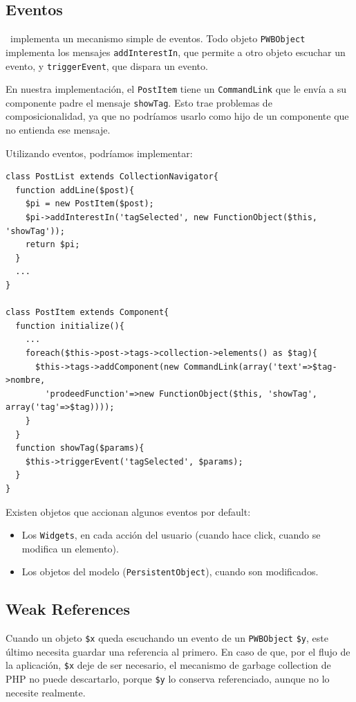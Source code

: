 
\subsection{Eventos}
\label{sub-events}
\PWB \ implementa un mecanismo simple de eventos. Todo objeto \verb"PWBObject" implementa los mensajes \verb"addInterestIn", que permite a otro objeto escuchar un evento, y \verb"triggerEvent", que dispara un evento.

En nuestra implementación, el \verb"PostItem" tiene un \verb"CommandLink" que le envía a su componente padre el mensaje \verb"showTag". Esto trae problemas de composicionalidad, ya que no podríamos usarlo como hijo de un componente que no entienda ese mensaje.



Utilizando eventos, podríamos implementar:

\begin{verbatim}
class PostList extends CollectionNavigator{
  function addLine($post){
    $pi = new PostItem($post);
    $pi->addInterestIn('tagSelected', new FunctionObject($this, 'showTag'));
    return $pi;
  }
  ...
}

class PostItem extends Component{
  function initialize(){
    ...
    foreach($this->post->tags->collection->elements() as $tag){
      $this->tags->addComponent(new CommandLink(array('text'=>$tag->nombre,
        'prodeedFunction'=>new FunctionObject($this, 'showTag', array('tag'=>$tag))));
    }
  }
  function showTag($params){
    $this->triggerEvent('tagSelected', $params);
  }
}

\end{verbatim}

Existen objetos que accionan algunos eventos por default:
\begin{itemize}
\item Los \verb"Widgets", en cada acción del usuario (cuando hace click, cuando se modifica un elemento).
\item Los objetos del modelo (\verb"PersistentObject"), cuando son modificados.
\end{itemize}

\subsection{Weak References}
\label{sub-weak}
Cuando un objeto \verb"$x" queda escuchando un evento de un \verb"PWBObject" \verb"$y", este último necesita guardar una referencia al primero. En caso de que, por el flujo de la aplicación, \verb'$x' deje de ser necesario, el mecanismo de garbage collection de PHP no puede descartarlo, porque \verb'$y' lo conserva referenciado, aunque no lo necesite realmente.

